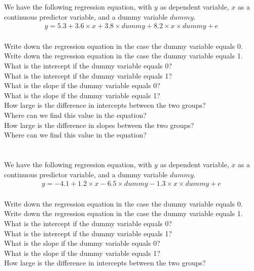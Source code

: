 We have the following regression equation, with $y$ as dependent variable, $x$ as a continuous predictor variable, and a dummy variable $dummy$.
\\
\begin{eqnarray} 
y = 5.3 + 3.6  \times x + 3.8  \times dummy + 8.2  \times x  \times dummy + e \nonumber
\end{eqnarray}
\\
Write down the regression equation in the case the dummy variable equals 0.\\
Write down the regression equation in the case the dummy variable equals 1.\\
What is the intercept if the dummy variable equals 0?\\
What is the intercept if the dummy variable equals 1?\\
What is the slope if the dummy variable equals 0?\\
What is the slope if the dummy variable equals 1?\\
How large is the difference in intercepts between the two groups?\\
Where can we find this value in the equation?\\
How large is the difference in slopes between the two groups?\\
Where can we find this value in the equation?\\
\\
\\
We have the following regression equation, with $y$ as dependent variable, $x$ as a continuous predictor variable, and a dummy variable $dummy$.
\\
\begin{eqnarray} 
y = - 4.1 + 1.2  \times x - 6.5  \times dummy - 1.3 \times x \times dummy + e \nonumber
\end{eqnarray}
\\
Write down the regression equation in the case the dummy variable equals 0.\\
Write down the regression equation in the case the dummy variable equals 1.\\
What is the intercept if the dummy variable equals 0?\\
What is the intercept if the dummy variable equals 1?\\
What is the slope if the dummy variable equals 0?\\
What is the slope if the dummy variable equals 1?\\
How large is the difference in intercepts between the two groups?\\ 
